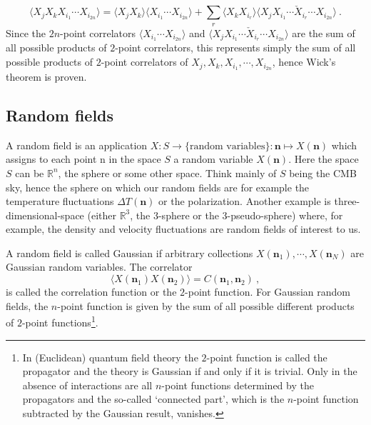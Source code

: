 \documentclass[12pt,a4paper]{article}
\renewcommand{\vec}[1]{\boldsymbol{#1}}
\begin{document}
\begin{equation}
\langle X_j X_{k} X_{i_1} \cdots X_{i_{2n}} \rangle = \langle X_j X_{k} \rangle \langle X_{i_1} \cdots X_{i_{2n}} \rangle +\sum_r \langle X_k X_{i_r} \rangle \langle X_j X_{i_1} \cdots \check{X}_{i_r} \cdots X_{i_{2n}} \rangle ~.
\end{equation}
Since the $2n$-point correlators $\langle X_{i_1} \cdots X_{i_{2n}} \rangle$ and $\langle X_j X_{i_1} \cdots \check{X}_{i_r} \cdots X_{i_{2n}} \rangle$ are the sum of all possible products of $2$-point correlators, this represents simply the sum of all possible products of $2$-point correlators of $X_j, X_k, X_{i_1}, \cdots , X_{i_{2n}}$, hence Wick's theorem is proven.




























\subsection{Random fields}
\cite{2008cmb..book.....D} A random field is an application $X : S \rightarrow \{\text{random variables}\} : \vec{n} \mapsto X(\vec{n})$ which assigns to each point n in the space $S$ a random variable $X(\vec{n})$. Here the space $S$ can be $\mathbb{R}^n$, the sphere or some other space. Think mainly of $S$ being the CMB sky, hence the sphere on which our random fields are for example the temperature fluctuations $\Delta T(\vec{n})$ or the polarization. Another example is three-dimensional-space  (either $\mathbb{R}^3$, the $3$-sphere or the $3$-pseudo-sphere) where, for example, the density and velocity fluctuations are random fields of interest to us.

A random field is called Gaussian if arbitrary collections $X(\vec{n}_1), \cdots , X(\vec{n}_N)$ are Gaussian random variables. The correlator
\begin{equation}
\langle X(\vec{n}_1) X(\vec{n}_2) \rangle = C(\vec{n}_1, \vec{n}_2) ~,
\end{equation}
is called the correlation function or the $2$-point function. For Gaussian random fields, the $n$-point function is given by the sum of all possible different products of $2$-point functions\footnote{In (Euclidean) quantum field theory the $2$-point function is called the propagator and the theory is Gaussian if and only if it is trivial. Only in the absence of interactions are all $n$-point functions determined by the propagators and the so-called `connected part', which is the $n$-point function subtracted by the Gaussian result, vanishes.}.
\end{document}
